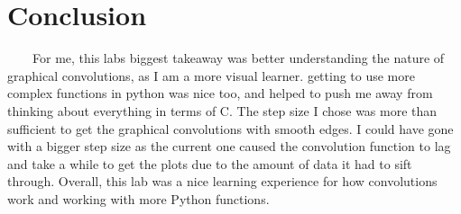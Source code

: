 \documentclass[11pt,a4]{article}
\begin{document}
\section{Conclusion}
\ \ \ \ For me, this labs biggest takeaway was better understanding the nature of graphical convolutions, as I am a more visual learner. getting to use more complex functions in python was nice too, and helped to push me away from thinking about everything in terms of C. The step size I chose was more than sufficient to get the graphical convolutions with smooth edges. I could have gone with a bigger step size as the current one caused the convolution function to lag and take a while to get the plots due to the amount of data it had to sift through. Overall, this lab was a nice learning experience for how convolutions work and working with more Python functions.
\end{document}
